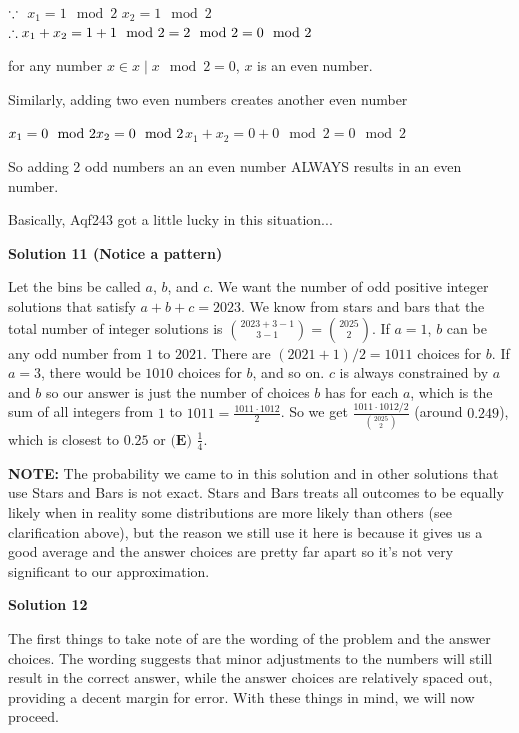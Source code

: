 \begin{enumerate}
 
$\because \newline$ $x_1=1\mod{2}$
$x_2=1\mod{2}$
$\therefore \\ x_1+x_2=1+1 \mod{2}=2 \mod{2}= 0 \mod{2}$

 for any number $x\in{{}x\mid x\mod{2}=0{}}$, $x$ is an even number.

 Similarly, adding two even numbers creates another even number

 $x_1=0 \mod{2} \\ x_2=0 \mod{2}$$x_1+x_2=0+0 \mod{2}=0 \mod{2}$

 So adding 2 odd numbers an an even number ALWAYS results in an even number. 

 Basically, Aqf243 got a little lucky in this situation...

 



\textbf{Solution 11 (Notice a pattern)}

Let the bins be called $a$, $b$, and $c$. We want the number of odd positive integer solutions that satisfy $a + b + c = 2023$. We know from stars and bars that the total number of integer solutions is $\binom{2023 + 3 - 1}{3 - 1} = \binom{2025}{2}$. If $a = 1$, $b$ can be any odd number from $1$ to $2021$. There are $(2021 + 1)/2 = 1011$ choices for $b$. If $a = 3$, there would be $1010$ choices for $b$, and so on. $c$ is always constrained by $a$ and $b$ so our answer is just the number of choices $b$ has for each $a$, which is the sum of all integers from $1$ to $1011 = \frac{1011 \cdot 1012}{2}$. So we get $\frac{1011 \cdot 1012/2}{\binom{2025}{2}}$ (around $0.249$), which is closest to $0.25$ or $\boxed{\textbf{(E) }\frac{1}{4}}$.

 \textbf{NOTE:} The probability we came to in this solution and in other solutions that use Stars and Bars is not exact. Stars and Bars treats all outcomes to be equally likely when in reality some distributions are more likely than others (see clarification above), but the reason we still use it here is because it gives us a good average and the answer choices are pretty far apart so it’s not very significant to our approximation.

 



\textbf{Solution 12}

The first things to take note of are the wording of the problem and the answer choices. The wording suggests that minor adjustments to the numbers will still result in the correct answer, while the answer choices are relatively spaced out, providing a decent margin for error. With these things in mind, we will now proceed.


\end{enumerate}

